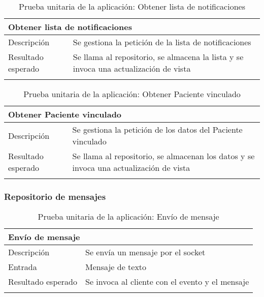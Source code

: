 \begin{longtable}{|p{} p{}|}
    \hline
    \multicolumn{2}{|l|}{\textbf{Obtener lista de notificaciones}} \\ \hline 
    Descripción                 & Se gestiona la petición de la lista de notificaciones \\ \hline
    Resultado esperado          & Se llama al repositorio, se almacena la lista y se invoca una actualización de vista \\ \hline
    \caption{Prueba unitaria de la aplicación: Obtener lista de notificaciones}
    \label{cp:u:app:obtener_lista_notificaciones_vista}
\end{longtable}

\begin{longtable}{|p{} p{}|}
    \hline
    \multicolumn{2}{|l|}{\textbf{Obtener Paciente vinculado}} \\ \hline 
    Descripción                 & Se gestiona la petición de los datos del Paciente vinculado \\ \hline
    Resultado esperado          & Se llama al repositorio, se almacenan los datos y se invoca una actualización de vista \\ \hline
    \caption{Prueba unitaria de la aplicación: Obtener Paciente vinculado}
    \label{cp:u:app:obtener_paciente_vinculado_vista}
\end{longtable}

\subsubsection{Repositorio de mensajes}

\begin{longtable}{|p{} p{}|}
    \hline
    \multicolumn{2}{|l|}{\textbf{Envío de mensaje}} \\ \hline 
    Descripción                 & Se envía un mensaje por el socket \\ \hline
    Entrada                     & Mensaje de texto \\ \hline
    Resultado esperado          & Se invoca al cliente con el evento y el mensaje  \\ \hline
    \caption{Prueba unitaria de la aplicación: Envío de mensaje}
    \label{cp:u:app:envio_mensajes_repo}
\end{longtable}

